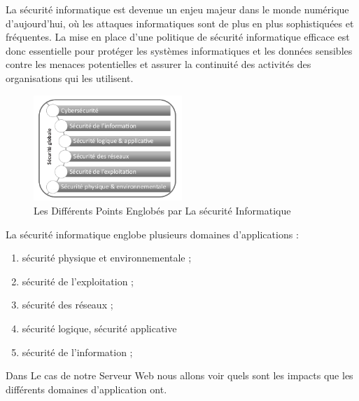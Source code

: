   La sécurité informatique est devenue un enjeu majeur dans le monde numérique d’aujourd’hui, où les attaques informatiques sont de plus en plus sophistiquées et fréquentes. La mise en place d'une politique de sécurité informatique efficace est donc essentielle pour protéger les systèmes informatiques et les données sensibles contre les menaces potentielles et assurer la continuité des activités des organisations qui les utilisent.\\
\begin{figure}[h]
	\begin{center}
\includegraphics[width=0.5\textwidth]{PhotoMemoire/image_sec.png}
\caption{Les Différents Points Englobés par La sécurité Informatique \cite{15}}
	\end{center}
\end{figure}

La sécurité informatique englobe plusieurs domaines d'applications :
\begin{enumerate}
\item  sécurité physique et environnementale ;
\item  sécurité de l’exploitation ;
\item   sécurité des réseaux ;
\item  sécurité logique, sécurité applicative 
\item   sécurité de l’information ;
\end{enumerate}
Dans Le cas de notre Serveur Web nous allons voir quels sont les impacts que les différents domaines d'application ont. \\ 
